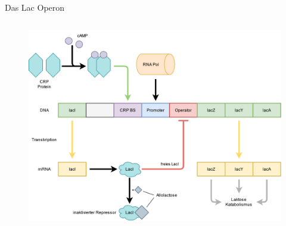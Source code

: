 \documentclass[11pt,aspectratio=169,reqno]{beamer}
\begin{document}
\begin{frame}{Das Lac Operon}
\begin{columns}
    \begin{figure}
        \centering
        \includegraphics[width=\textwidth]{images/lac_operon.png}
    \end{figure}
\end{columns}
\end{frame}
\end{document}
